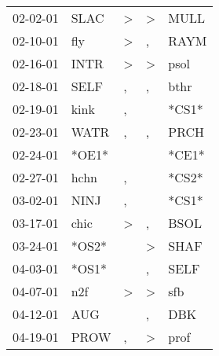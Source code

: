 \begin{supertabular}{p{0.07\textwidth}p{0.06\textwidth}p{0.02\textwidth}p{0.02\textwidth}p{0.06\textwidth}}
          02-02-01\textsuperscript{} &           SLAC\textsuperscript{} &     \textgreater &  \textgreater &           MULL\textsuperscript{} \\
          02-10-01\textsuperscript{} &            fly\textsuperscript{} &     \textgreater &             , &           RAYM\textsuperscript{} \\
          02-16-01\textsuperscript{} &           INTR\textsuperscript{} &     \textgreater &  \textgreater &           psol\textsuperscript{} \\
          02-18-01\textsuperscript{} &           SELF\textsuperscript{} &                , &             , &           bthr\textsuperscript{} \\
          02-19-01\textsuperscript{} &           kink\textsuperscript{} &                , &               &                            *CS1* \\
          02-23-01\textsuperscript{} &           WATR\textsuperscript{} &                , &             , &           PRCH\textsuperscript{} \\
          02-24-01\textsuperscript{} &                            *OE1* &                  &               &                            *CE1* \\
          02-27-01\textsuperscript{} &           hchn\textsuperscript{} &                , &               &                            *CS2* \\
          03-02-01\textsuperscript{} &           NINJ\textsuperscript{} &                , &               &                            *CS1* \\
          03-17-01\textsuperscript{} &           chic\textsuperscript{} &     \textgreater &             , &           BSOL\textsuperscript{} \\
          03-24-01\textsuperscript{} &                            *OS2* &                  &  \textgreater &           SHAF\textsuperscript{} \\
          04-03-01\textsuperscript{} &                            *OS1* &                  &             , &           SELF\textsuperscript{} \\
          04-07-01\textsuperscript{} &            n2f\textsuperscript{} &     \textgreater &  \textgreater &            sfb\textsuperscript{} \\
          04-12-01\textsuperscript{} &            AUG\textsuperscript{} &                  &             , &            DBK\textsuperscript{} \\
          04-19-01\textsuperscript{} &           PROW\textsuperscript{} &                , &  \textgreater &           prof\textsuperscript{} \\

\end{supertabular}
